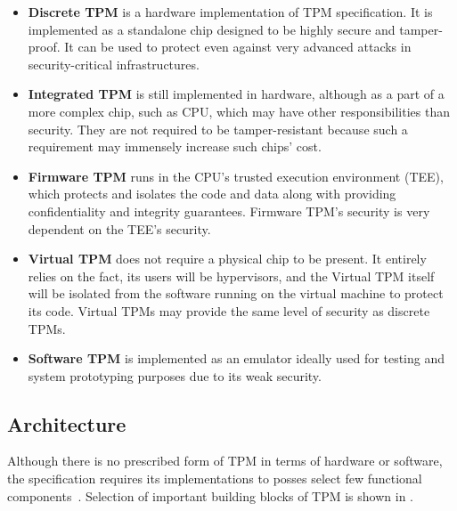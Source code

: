 \begin{itemize}
    \item \textbf{Discrete TPM} is a hardware implementation of TPM specification. It is implemented as a standalone chip designed to be highly secure and tamper-proof. It can be used to protect even against very advanced attacks in security-critical infrastructures.
    \item \textbf{Integrated TPM} is still implemented in hardware, although as a part of a more complex chip, such as CPU, which may have other responsibilities than security. They are not required to be tamper-resistant because such a requirement may immensely increase such chips' cost.
    \item \textbf{Firmware TPM} runs in the CPU's trusted execution environment (TEE), which protects and isolates the code and data along with providing confidentiality and integrity guarantees. Firmware TPM's security is very dependent on the TEE's security.
    \item \textbf{Virtual TPM} does not require a physical chip to be present. It  entirely relies on the fact, its users will be hypervisors, and the Virtual TPM itself will be isolated from the software running on the virtual machine to protect its code. Virtual TPMs may provide the same level of security as discrete TPMs.
    \item \textbf{Software TPM} is implemented as an emulator ideally used for testing and system prototyping purposes due to its weak security.
\end{itemize}

\subsection{Architecture}
Although there is no prescribed form of TPM in terms of hardware or software, the specification requires its implementations to posses select few functional components~\cite{tcg_p1_architecture}. Selection of important building blocks of TPM is shown in .

